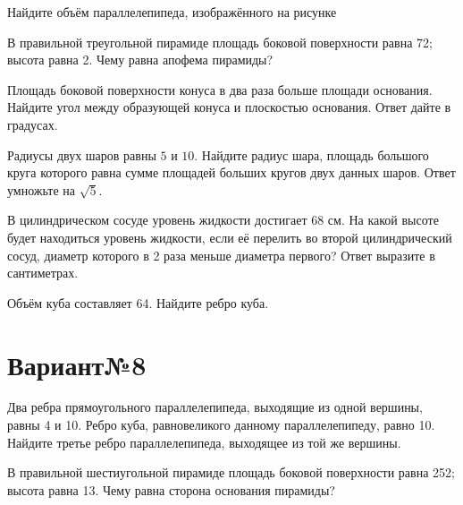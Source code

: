 \documentclass[4apaper]{article}
\begin{document}
\begin{taskBN}{1}
Найдите объём параллелепипеда, изображённого на рисунке
\end{taskBN}

\begin{taskBN}{2}
В правильной треугольной пирамиде площадь боковой поверхности равна 72; высота равна 2. Чему равна апофема пирамиды?
\end{taskBN}

\begin{taskBN}{3}
Площадь боковой поверхности конуса в два раза больше площади основания. Найдите угол между образующей конуса и плоскостью основания. Ответ дайте в градусах.
\end{taskBN}

\begin{taskBN}{4}
Радиусы двух шаров равны $5$ и $10$. Найдите радиус шара, площадь большого круга которого равна сумме площадей больших кругов двух данных шаров. Ответ умножьте на $\sqrt{5}$.
\end{taskBN}

\begin{taskBN}{5}
В цилиндрическом сосуде уровень жидкости достигает 68 см. На какой высоте будет находиться уровень жидкости, если её перелить во второй цилиндрический сосуд, диаметр которого в 2 раза меньше диаметра первого? Ответ выразите в сантиметрах.
\end{taskBN}

\begin{taskBN}{6}
Объём куба составляет 64. Найдите ребро куба.
\end{taskBN}
\newpage\section*{Вариант№8}

\begin{taskBN}{1}
Два ребра прямоугольного параллелепипеда, выходящие из одной вершины, равны 4 и 10. Ребро куба, равновеликого данному параллелепипеду, равно 10. Найдите третье ребро параллелепипеда, выходящее из той же вершины.
\end{taskBN}

\begin{taskBN}{2}
В правильной шестиугольной пирамиде площадь боковой поверхности равна 252; высота равна 13. Чему равна сторона основания пирамиды?
\end{taskBN}
\end{document}
